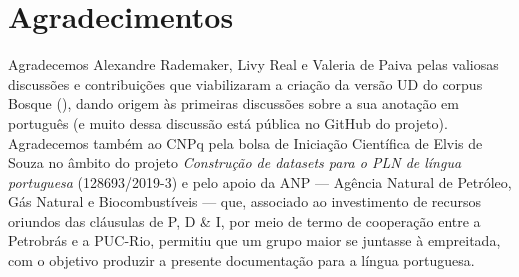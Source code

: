 \documentclass[output=paper,colorlinks,citecolor=brown]{langscibook}
\begin{document}
\chapter*{Agradecimentos}

Agradecemos Alexandre Rademaker, Livy Real e Valeria de Paiva pelas valiosas discussões e contribuições que viabilizaram a criação da versão UD do corpus Bosque (\citet{rademaker2017universal}), dando origem às primeiras discussões sobre a sua anotação em português (e muito dessa discussão está pública no GitHub do projeto). Agradecemos também ao CNPq pela bolsa de Iniciação Científica de Elvis de Souza no âmbito do projeto \emph{Construção de datasets para o PLN de língua portuguesa} (128693/2019-3) e pelo apoio da ANP — Agência Natural de Petróleo, Gás Natural e Biocombustíveis — que, associado ao investimento de recursos oriundos das cláusulas de P, D \& I, por meio de termo de cooperação entre a Petrobrás e a PUC-Rio, permitiu que um grupo maior se juntasse à empreitada, com o objetivo produzir a presente documentação para a língua portuguesa.

\printbibliography[heading=subbibliography,notkeyword=this]
\end{document}
